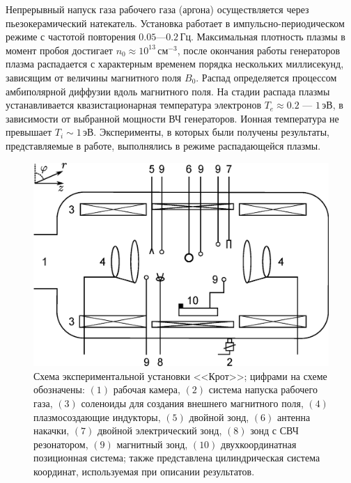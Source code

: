 \documentclass[autoref,10pt]{disser}
\begin{document}
Непрерывный напуск газа рабочего газа (аргона) осуществляется через пьезокерамический натекатель. Установка работает в импульсно-периодическом режиме с частотой повторения $0.05$---$0.2$\,Гц. Максимальная плотность плазмы в момент пробоя достигает $n_{0} \approx 10^{13}$\,см$^{-3}$, после окончания работы генераторов плазма распадается с характерным временем порядка нескольких миллисекунд, зависящим от величины магнитного поля $B_{0}$. Распад определяется процессом амбиполярной диффузии вдоль магнитного поля. На стадии распада плазмы устанавливается квазистационарная температура электронов $T_{e} \approx 0.2$ --- $1$\,эВ, в зависимости от выбранной мощности ВЧ генераторов. Ионная температура не превышает $T_{i} \sim 1$\,эВ. Эксперименты, в которых были получены результаты, представляемые в работе, выполнялись в режиме распадающейся плазмы.
\begin{figure}[H]
    \centering
    \includegraphics*[width=0.9\columnwidth]{pics/KROT.eps}
    \caption{Схема экспериментальной установки <<Крот>>; цифрами на схеме обозначены:  $(1)$ рабочая камера,  $(2)$ система напуска рабочего газа, $(3)$  соленоиды для создания внешнего магнитного поля, $(4)$ плазмосоздающие индукторы, $(5)$ двойной зонд, $(6)$ антенна накачки, $(7)$ двойной электрический зонд, $(8)$ зонд с СВЧ резонатором, $(9)$ магнитный зонд, $(10)$ двухкоординатная позиционная система; также представлена цилиндрическая система  координат, используемая при описании результатов.}
    \label{fig:KROT}
 \end{figure}
\end{document}
